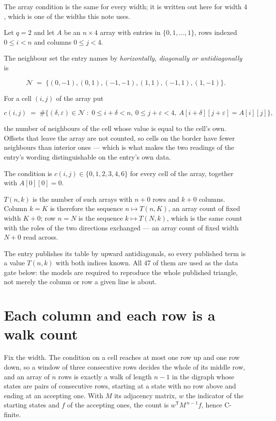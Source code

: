 \documentclass[11pt]{article}
\theoremstyle{definition}
\begin{document}
The array condition is the same for every width; it is written out here for width $4$, which is one of the widths this note uses.

Let $q = 2$ and let $A$ be an $n \times 4$ array with entries in $\{0,1,\dots,1\}$, rows indexed $0 \le i < n$ and columns $0 \le j < 4$.

The neighbour set the entry names by {\itshape horizontally, diagonally or antidiagonally} is

\[\mathcal{N} \;=\; \{(0,-1), (0,1), (-1,-1), (1,1), (-1,1), (1,-1)\}.\]

For a cell $(i,j)$ of the array put

\[c(i,j) \;=\; \#\bigl\{(\delta,\varepsilon)\in\mathcal{N} \;:\; 0\le i+\delta<n,\ 0\le j+\varepsilon<4,\ A[i+\delta][j+\varepsilon] = A[i][j]\bigr\},\]

the number of neighbours of the cell whose value is equal to the cell's own. Offsets that leave the array are not counted, so cells on the border have fewer neighbours than interior ones --- which is what makes the two readings of the entry's wording distinguishable on the entry's own data.

The condition is $c(i,j) \in \{0, 1, 2, 3, 4, 6\}$ for every cell of the array, together with $A[0][0]=0$.

$T(n,k)$ is the number of such arrays with $n + 0$ rows and $k + 0$ columns. Column $k = K$ is therefore the sequence $n \mapsto T(n,K)$, an array count of fixed width $K + 0$; row $n = N$ is the sequence $k \mapsto T(N,k)$, which is the same count with the roles of the two directions exchanged --- an array count of fixed width $N + 0$ read across.

The entry publishes its table by upward antidiagonals, so every published term is a value $T(n,k)$ with both indices known. All 47 of them are used as the data gate below: the models are required to reproduce the whole published triangle, not merely the column or row a given line is about.

\section{Each column and each row is a walk count}

Fix the width. The condition on a cell reaches at most one row up and one row down, so a window of three consecutive rows decides the whole of its middle row, and an array of $n$ rows is exactly a walk of length $n-1$ in the digraph whose states are pairs of consecutive rows, starting at a state with no row above and ending at an accepting one. With $M$ its adjacency matrix, $w$ the indicator of the starting states and $f$ of the accepting ones, the count is $w^{\mathsf T}M^{\,n-1}f$, hence C-finite.
\end{document}
